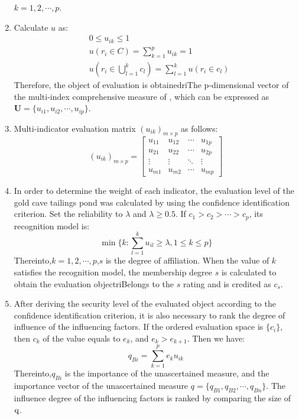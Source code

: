 \documentclass[12pt]{article}  %
\begin{document}
\begin{enumerate}
\hspace{4.5em}$k=1,2,\cdots ,p$.
\item Calculate $u$ as:
\begin{eqnarray}
    &0\le u_{ik}\le 1\\
    &u(r_i\in C)=\sum_{k=1}^{p}u_{ik}=1\\
    &u(r_i\in \bigcup_{l=1}^{k}c_l)=\sum_{l=1}^{k}u(r_i\in c_l)
\end{eqnarray}
Therefore, the object of evaluation is obtainedriThe p-dimensional vector of the multi-index comprehensive measure of , which can be expressed as $\bm{U}=\{u_{i1},u_{i2},\cdots ,u_{ip}\}$. 
\item Multi-indicator evaluation matrix $(u_{ik})_{m\times p}$ as follows:
\begin{equation}
    (u_{ik})_{m\times p}=\begin{bmatrix}
 u_{11} &u_{12}  &\cdots   &u_{1p} \\
  u_{21}&u_{22}  & \cdots  &u_{2p} \\
  \vdots & \vdots &  \ddots & \vdots\\
 u_{m1} &u_{m2}  &\cdots   &u_{mp}
\end{bmatrix} 
\end{equation}
    \item In order to determine the weight of each indicator, the evaluation level of the gold cave tailings pond was calculated by using the confidence identification criterion. Set the reliability to $\lambda$ and $\lambda \ge 0.5$. If $c_1>c_2>\cdots >c_p$, its recognition model is:
    \begin{equation}
        \min \{k:\sum_{l=1}^{k}u_{il}\ge \lambda,1\le k\le p\}
    \end{equation}
Thereinto,$k=1,2,\cdots ,p$,$s$ is the degree of affiliation. When the value of $k$ satisfies the recognition model, the membership degree $s$ is calculated to obtain the evaluation objectriBelongs to the $s$ rating and is credited as $c_s$.
    \item After deriving the security level of the evaluated object according to the confidence identification criterion, it is also necessary to rank the degree of influence of the influencing factors. If the ordered evaluation space is $\{c_i\}$, then $c_k$ of the value equals to $e_k$, and $e_k>e_{k+1}$. Then we have:
    \begin{equation}
        q_{Bi}=\sum_{k=1}^{p}e_ku_{ik}
    \end{equation}
Thereinto,$q_{Bi}$ is the importance of the unascertained measure, and the importance vector of the unascertained measure $q=\{q_{B1}, q_{B2},\cdots , q_{Bn}\}$. The influence degree of the influencing factors is ranked by comparing the size of $\rm{q}$.
\end{enumerate}
\end{document}
